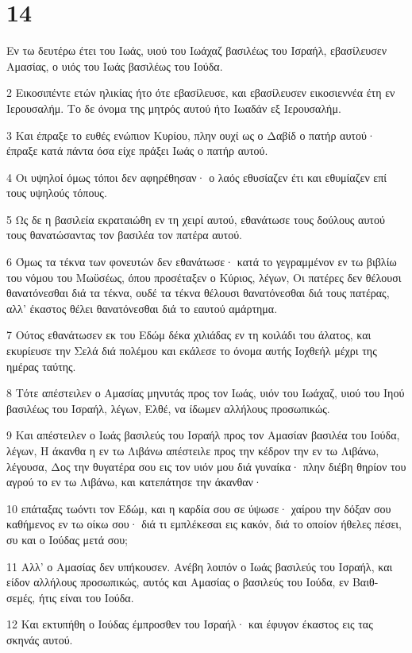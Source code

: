 \chapter{14}

\par Εν τω δευτέρω έτει του Ιωάς, υιού του Ιωάχαζ βασιλέως του Ισραήλ, εβασίλευσεν Αμασίας, ο υιός του Ιωάς βασιλέως του Ιούδα.
\par 2 Εικοσιπέντε ετών ηλικίας ήτο ότε εβασίλευσε, και εβασίλευσεν εικοσιεννέα έτη εν Ιερουσαλήμ. Το δε όνομα της μητρός αυτού ήτο Ιωαδάν εξ Ιερουσαλήμ.
\par 3 Και έπραξε το ευθές ενώπιον Κυρίου, πλην ουχί ως ο Δαβίδ ο πατήρ αυτού· έπραξε κατά πάντα όσα είχε πράξει Ιωάς ο πατήρ αυτού.
\par 4 Οι υψηλοί όμως τόποι δεν αφηρέθησαν· ο λαός εθυσίαζεν έτι και εθυμίαζεν επί τους υψηλούς τόπους.
\par 5 Ως δε η βασιλεία εκραταιώθη εν τη χειρί αυτού, εθανάτωσε τους δούλους αυτού τους θανατώσαντας τον βασιλέα τον πατέρα αυτού.
\par 6 Όμως τα τέκνα των φονευτών δεν εθανάτωσε· κατά το γεγραμμένον εν τω βιβλίω του νόμου του Μωϋσέως, όπου προσέταξεν ο Κύριος, λέγων, Οι πατέρες δεν θέλουσι θανατόνεσθαι διά τα τέκνα, ουδέ τα τέκνα θέλουσι θανατόνεσθαι διά τους πατέρας, αλλ' έκαστος θέλει θανατόνεσθαι διά το εαυτού αμάρτημα.
\par 7 Ούτος εθανάτωσεν εκ του Εδώμ δέκα χιλιάδας εν τη κοιλάδι του άλατος, και εκυρίευσε την Σελά διά πολέμου και εκάλεσε το όνομα αυτής Ιοχθεήλ μέχρι της ημέρας ταύτης.
\par 8 Τότε απέστειλεν ο Αμασίας μηνυτάς προς τον Ιωάς, υιόν του Ιωάχαζ, υιού του Ιηού βασιλέως του Ισραήλ, λέγων, Ελθέ, να ίδωμεν αλλήλους προσωπικώς.
\par 9 Και απέστειλεν ο Ιωάς βασιλεύς του Ισραήλ προς τον Αμασίαν βασιλέα του Ιούδα, λέγων, Η άκανθα η εν τω Λιβάνω απέστειλε προς την κέδρον την εν τω Λιβάνω, λέγουσα, Δος την θυγατέρα σου εις τον υιόν μου διά γυναίκα· πλην διέβη θηρίον του αγρού το εν τω Λιβάνω, και κατεπάτησε την άκανθαν·
\par 10 επάταξας τωόντι τον Εδώμ, και η καρδία σου σε ύψωσε· χαίρου την δόξαν σου καθήμενος εν τω οίκω σου· διά τι εμπλέκεσαι εις κακόν, διά το οποίον ήθελες πέσει, συ και ο Ιούδας μετά σου;
\par 11 Αλλ' ο Αμασίας δεν υπήκουσεν. Ανέβη λοιπόν ο Ιωάς βασιλεύς του Ισραήλ, και είδον αλλήλους προσωπικώς, αυτός και Αμασίας ο βασιλεύς του Ιούδα, εν Βαιθ-σεμές, ήτις είναι του Ιούδα.
\par 12 Και εκτυπήθη ο Ιούδας έμπροσθεν του Ισραήλ· και έφυγον έκαστος εις τας σκηνάς αυτού.
